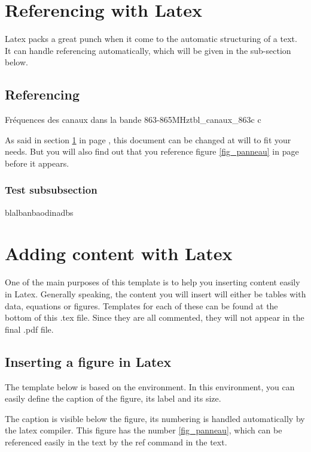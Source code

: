 \section{Referencing with Latex}\label{section_ref}

Latex packs a great punch when it come to the automatic structuring of a text. 
It can handle referencing automatically, which will be given in the sub-section below.

	\subsection{Referencing}
	\begin{mytable}{Fréquences des canaux dans la bande 863-865MHz}{tbl_canaux_863}{c c}
	\end{mytable}
	As said in section \ref{section_ref} in page \pageref{section_writing}, this document can be changed at will to fit your needs.
	But you will also find out that you reference figure \ref{fig_panneau} in page \pageref{fig_panneau} before it appears. 

		\subsubsection{Test subsubsection}
		blalbanbaodinadbs 
	
\section{Adding content with Latex}\label{section_content}

One of the main purposes of this template is to help you inserting content easily in Latex. 
Generally speaking, the content you will insert will either be tables with data, equations or figures. 
Templates for each of these can be found at the bottom of this .tex file. 
Since they are all commented, they will not appear in the final .pdf file.

	\subsection{Inserting a figure in Latex}
	
	The template below is based on the  environment. 
	In this environment, you can easily define the caption of the figure, its label and its size. 
	
	The caption is visible below the figure, its numbering is handled automatically by the latex compiler.
	This figure has the number \ref{fig_panneau}, which can be referenced easily in the text by the ref command in the text.
	
